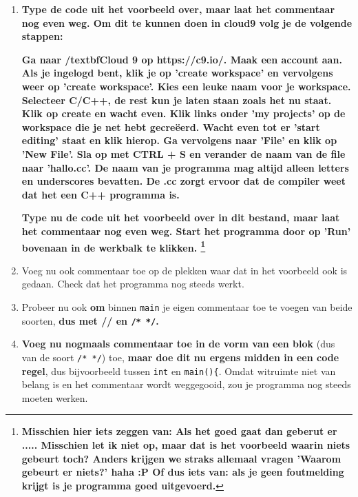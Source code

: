 \documentclass[12pt,a4paper]{article}
\newcommand{\icode}{\lstinline}
\begin{document}
\begin{enumerate}
	\item
		\textbf{Type de code uit het voorbeeld over, maar laat het commentaar nog even weg. Om dit te kunnen doen in cloud9 volg je de volgende stappen: }
		
		\textbf{Ga naar /textbf{Cloud 9} op https://c9.io/. Maak een account aan. Als je ingelogd bent, klik je op 'create workspace' en vervolgens weer op 'create workspace'. Kies een leuke naam voor je workspace. Selecteer C/C++, de rest kun je laten staan zoals het nu staat. Klik op create en wacht even. Klik links onder 'my projects' op de workspace die je net hebt gecreëerd. Wacht even tot er 'start editing' staat en klik hierop. Ga vervolgens naar 'File' en klik op 'New File'. Sla op met CTRL + S en verander de naam van de file naar 'hallo.cc'. De naam van je programma mag altijd alleen letters en underscores bevatten. De .cc zorgt ervoor dat de compiler weet dat het een C++ programma is. }
		
		\textbf{Type nu de code uit het voorbeeld over in dit bestand, maar laat het commentaar nog even weg. Start het programma door op 'Run' bovenaan in de werkbalk te klikken. \footnote{\textbf{Misschien hier iets zeggen van: Als het goed gaat dan geberut er ..... Misschien let ik niet op, maar dat is het voorbeeld waarin niets gebeurt toch? Anders krijgen we straks allemaal vragen 'Waarom gebeurt er niets?' haha :P Of dus iets van: als je geen foutmelding krijgt is je programma goed uitgevoerd.}}	}
	\item
		Voeg nu ook commentaar toe op de plekken waar dat in het voorbeeld ook is gedaan. Check dat het programma nog steeds werkt.
	\item
		Probeer nu ook \textbf{om} binnen \icode{main} je eigen commentaar toe te voegen van beide soorten, \textbf{dus met // en \icode{/* */}.}
	\item 
		\textbf{Voeg nu nogmaals commentaar toe in de vorm van een blok} (dus van de soort \icode{/* */}) toe, \textbf{maar doe dit nu ergens midden in een code regel}, dus bijvoorbeeld tussen \icode{int} en \icode{main(){}. Omdat witruimte niet van belang is en het commentaar wordt weggegooid, zou je programma nog steeds moeten werken.
\end{enumerate}
\end{document}
